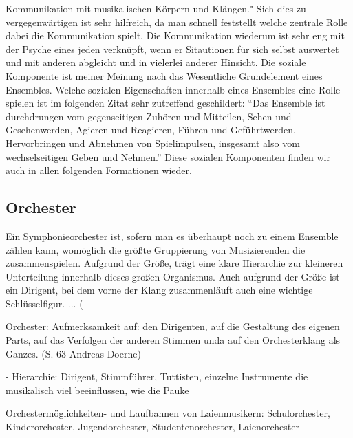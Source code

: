 Kommunikation mit musikalischen Körpern und Klängen."
\autocite[62]{doerne:umfassend_musizieren} Sich dies zu vergegenwärtigen ist
sehr hilfreich, da man schnell feststellt welche zentrale Rolle dabei die
Kommunikation spielt. Die Kommunikation wiederum ist sehr eng mit der Psyche
eines jeden verknüpft, wenn er Sitautionen für sich selbst auswertet und mit
anderen abgleicht und in vielerlei anderer Hinsicht. Die soziale Komponente ist
meiner Meinung nach das Wesentliche Grundelement eines Ensembles. Welche
sozialen Eigenschaften innerhalb eines Ensembles eine Rolle spielen ist im
folgenden Zitat sehr zutreffend geschildert: \enquote{Das Ensemble ist durchdrungen vom
gegenseitigen Zuhören und Mitteilen, Sehen und Gesehenwerden, Agieren und
Reagieren, Führen und Geführtwerden, Hervorbringen und Abnehmen von
Spielimpulsen, insgesamt also vom wechselseitigen Geben und Nehmen.}
\autocite[62]{doerne:umfassend_musizieren} Diese sozialen Komponenten finden wir
auch in allen folgenden Formationen wieder. 


\subsection{Orchester} 

Ein Symphonieorchester ist, sofern man es überhaupt noch zu einem Ensemble
zählen kann, womöglich die größte Gruppierung von Musizierenden die
zusammenspielen. Aufgrund der Größe, trägt eine klare Hierarchie zur kleineren
Unterteilung innerhalb dieses großen Organismus. Auch aufgrund der Größe ist ein
Dirigent, bei dem vorne der Klang zusammenläuft auch eine wichtige
Schlüsselfigur. ... (%

Orchester: Aufmerksamkeit auf: den Dirigenten, auf die Gestaltung des eigenen
Parts, auf das Verfolgen der anderen Stimmen unda auf den Orchesterklang als
Ganzes. (S. 63 Andreas Doerne)

- Hierarchie: Dirigent, Stimmführer, Tuttisten, einzelne Instrumente die
musikalisch viel beeinflussen, wie die Pauke

Orchestermöglichkeiten- und Laufbahnen von Laienmusikern: Schulorchester,
Kinderorchester, Jugendorchester, Studentenorchester, Laienorchester


